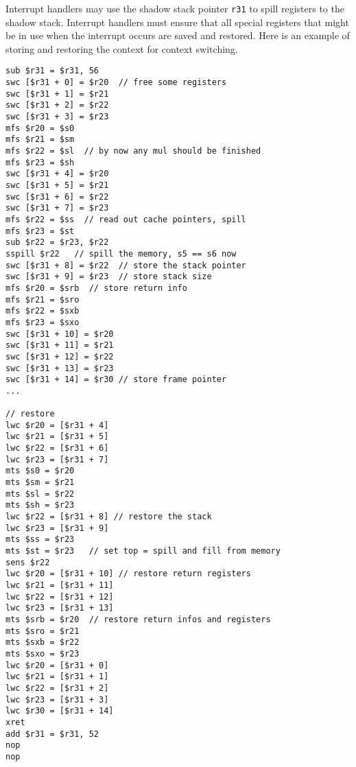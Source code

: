 Interrupt handlers may use the shadow stack pointer \texttt{r31} to spill registers
to the shadow stack. Interrupt handlers must ensure that all special registers
that might be in use when the interrupt occurs %
are saved and restored.
%
Here is an example of storing and restoring the context for context switching.
\begin{verbatim}
sub $r31 = $r31, 56
swc [$r31 + 0] = $r20  // free some registers
swc [$r31 + 1] = $r21
swc [$r31 + 2] = $r22
swc [$r31 + 3] = $r23
mfs $r20 = $s0
mfs $r21 = $sm
mfs $r22 = $sl  // by now any mul should be finished
mfs $r23 = $sh
swc [$r31 + 4] = $r20
swc [$r31 + 5] = $r21
swc [$r31 + 6] = $r22
swc [$r31 + 7] = $r23
mfs $r22 = $ss  // read out cache pointers, spill
mfs $r23 = $st
sub $r22 = $r23, $r22
sspill $r22   // spill the memory, s5 == s6 now
swc [$r31 + 8] = $r22  // store the stack pointer
swc [$r31 + 9] = $r23  // store stack size
mfs $r20 = $srb  // store return info
mfs $r21 = $sro
mfs $r22 = $sxb
mfs $r23 = $sxo
swc [$r31 + 10] = $r20
swc [$r31 + 11] = $r21
swc [$r31 + 12] = $r22
swc [$r31 + 13] = $r23
swc [$r31 + 14] = $r30 // store frame pointer
...

// restore
lwc $r20 = [$r31 + 4]
lwc $r21 = [$r31 + 5]
lwc $r22 = [$r31 + 6]
lwc $r23 = [$r31 + 7]
mts $s0 = $r20
mts $sm = $r21
mts $sl = $r22
mts $sh = $r23
lwc $r22 = [$r31 + 8] // restore the stack
lwc $r23 = [$r31 + 9]
mts $ss = $r23
mts $st = $r23   // set top = spill and fill from memory
sens $r22
lwc $r20 = [$r31 + 10] // restore return registers
lwc $r21 = [$r31 + 11]
lwc $r22 = [$r31 + 12]
lwc $r23 = [$r31 + 13]
mts $srb = $r20  // restore return infos and registers
mts $sro = $r21
mts $sxb = $r22
mts $sxo = $r23
lwc $r20 = [$r31 + 0]
lwc $r21 = [$r31 + 1]
lwc $r22 = [$r31 + 2]
lwc $r23 = [$r31 + 3]
lwc $r30 = [$r31 + 14]
xret
add $r31 = $r31, 52
nop
nop
\end{verbatim}

